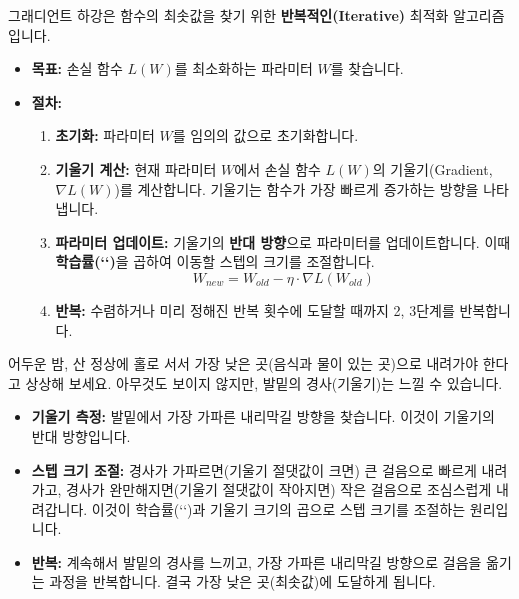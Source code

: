 \documentclass[11pt,a4paper]{article}
\begin{document}
\begin{summarybox}[title={그래디언트 하강(Gradient Descent)의 핵심}]
그래디언트 하강은 함수의 최솟값을 찾기 위한 \textbf{반복적인(Iterative)} 최적화 알고리즘입니다.
\begin{itemize}
    \item \textbf{목표:} 손실 함수 $L(W)$를 최소화하는 파라미터 $W$를 찾습니다.
    \item \textbf{절차:}
    \begin{enumerate}
        \item \textbf{초기화:} 파라미터 $W$를 임의의 값으로 초기화합니다.
        \item \textbf{기울기 계산:} 현재 파라미터 $W$에서 손실 함수 $L(W)$의 기울기(Gradient, $\nabla L(W)$)를 계산합니다. 기울기는 함수가 가장 빠르게 증가하는 방향을 나타냅니다.
        \item \textbf{파라미터 업데이트:} 기울기의 \textbf{반대 방향}으로 파라미터를 업데이트합니다. 이때 \textbf{학습률(`\eta`)}을 곱하여 이동할 스텝의 크기를 조절합니다.
        \[ W_{new} = W_{old} - \eta \cdot \nabla L(W_{old}) \]
        \item \textbf{반복:} 수렴하거나 미리 정해진 반복 횟수에 도달할 때까지 2, 3단계를 반복합니다.
    \end{enumerate}
\end{itemize}
\end{summarybox}

\begin{examplebox}
어두운 밤, 산 정상에 홀로 서서 가장 낮은 곳(음식과 물이 있는 곳)으로 내려가야 한다고 상상해 보세요. 아무것도 보이지 않지만, 발밑의 경사(기울기)는 느낄 수 있습니다.
\begin{itemize}
    \item \textbf{기울기 측정:} 발밑에서 가장 가파른 내리막길 방향을 찾습니다. 이것이 기울기의 반대 방향입니다.
    \item \textbf{스텝 크기 조절:} 경사가 가파르면(기울기 절댓값이 크면) 큰 걸음으로 빠르게 내려가고, 경사가 완만해지면(기울기 절댓값이 작아지면) 작은 걸음으로 조심스럽게 내려갑니다. 이것이 학습률(`\eta`)과 기울기 크기의 곱으로 스텝 크기를 조절하는 원리입니다.
    \item \textbf{반복:} 계속해서 발밑의 경사를 느끼고, 가장 가파른 내리막길 방향으로 걸음을 옮기는 과정을 반복합니다. 결국 가장 낮은 곳(최솟값)에 도달하게 됩니다.
\end{itemize}
\end{examplebox}
\end{document}
